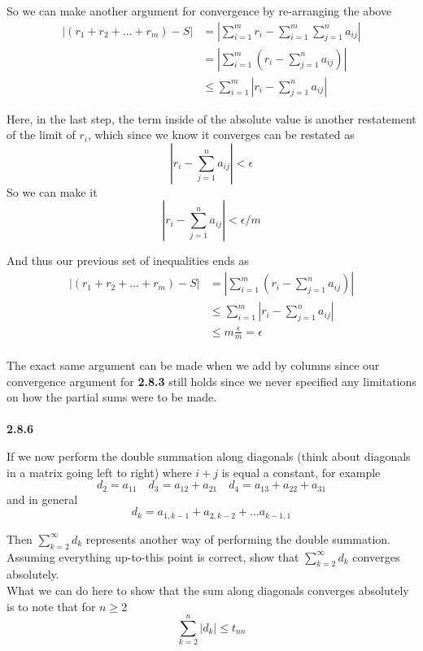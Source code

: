 So we can make another argument for convergence by re-arranging the above
\begin{align*}
\left| (r_1 + r_2 + \ldots + r_m) - S \right| &= \left| \sum^{m}_{i=1} r_i - \sum^{m}_{i=1} \sum^{n}_{j=1} a_{ij} \right| \\
&= \left| \sum^{m}_{i=1} \left( r_i - \sum^{n}_{j=1} a_{ij} \right) \right| \\
&\leq \sum^{m}_{i=1} \left|  r_i - \sum^{n}_{j=1} a_{ij} \right|
\end{align*}

Here, in the last step, the term inside of the absolute value is another restatement of the limit of $r_i$,
which since we know it converges can be restated as
$$
| r_i - \sum^{n}_{j=1} a_{ij} | < \epsilon
$$
So we can make it
$$
| r_i - \sum^{n}_{j=1} a_{ij} | < \epsilon / m
$$

And thus our previous set of inequalities ends as
\begin{align*}
\left| (r_1 + r_2 + \ldots + r_m) - S \right| &= \left| \sum^{m}_{i=1} \left( r_i - \sum^{n}_{j=1} a_{ij} \right) \right| \\
&\leq \sum^{m}_{i=1} \left|  r_i - \sum^{n}_{j=1} a_{ij} \right| \\
&\leq m \frac{\epsilon}{m} = \epsilon
\end{align*}
\\

The exact same argument can be made when we add by columns since our convergence argument
for \textbf{2.8.3} still holds since we never specified any limitations on how the partial
sums were to be made.
\\~\\


\textbf{2.8.6}

If we now perform the double summation along diagonals (think about diagonals in a matrix going left to right)
where $i+j$ is equal a constant, for example
$$
d_2 = a_{11}    \quad    d_3 = a_{12} + a_{21}  \quad   d_4 = a_{13} + a_{22} + a_{31}
$$
and in general
$$
d_k = a_{1,k-1} + a_{2,k-2} + \ldots a_{k-1, 1}
$$

Then $\sum^{\infty}_{k=2} d_k$ represents another way of performing the double summation.
\\

Assuming everything up-to-this point is correct, show that $\sum^{\infty}_{k=2} d_k$
converges absolutely.
\\

What we can do here to show that the sum along diagonals converges absolutely is to note that
for $n\geq2$
$$
\sum^{n}_{k=2} |d_k| \leq t_{nn}
$$

